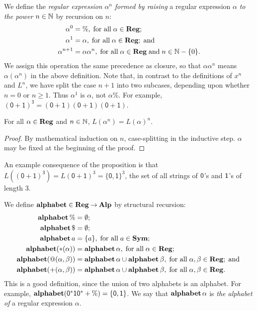 We define the \emph{regular expression} $\alpha^n$ \emph{formed by
raising} a regular expression $\alpha$ \emph{to the power} $n\in\mathbb{N}$ by
recursion on $n$:
%
%
\begin{align*}
\alpha^0       &= \%, \;\allowbreak\mbox{for all}\allowbreak\;\alpha\in\mathbf{Reg}; \\
\alpha^1       &= \alpha, \;\allowbreak\mbox{for all}\allowbreak\;\alpha\in\mathbf{Reg}; \;\allowbreak\mbox{and}\allowbreak\; \\
\alpha^{n + 1} &= \alpha\alpha^n,\;\allowbreak\mbox{for all}\allowbreak\;\alpha\in\mathbf{Reg}\;\allowbreak\mbox{and}\allowbreak\;
n\in\mathbb{N}-\{0\} .
\end{align*}
We assign this operation the same precedence as closure, so that
$\alpha\alpha^n$ means $\alpha(\alpha^n)$ in the above definition.
Note that, in contrast to the definitions of $x^n$ and $L^n$,
we have split the case $n+1$ into two subcases, depending upon
whether $n=0$ or $n\geq 1$. Thus
$\alpha^1$ is $\alpha$, not $\alpha\%$.
For example, $\mathsf{(0+1)^3}=\mathsf{(0+1)(0+1)(0+1)}$.

\begin{proposition}
\label{RegExponProp}
For all $\alpha\in\mathbf{Reg}$ and $n\in\mathbb{N}$, $L(\alpha^n)=L(\alpha)^n$.
\end{proposition}

\begin{proof}
By mathematical induction on $n$, case-splitting in the inductive
step. $\alpha$ may be fixed at the beginning of the proof.
\end{proof}

An example consequence of the proposition is that
$L(\mathsf{(0+1)^3})=L(\mathsf{0+1})^3=\{\mathsf{0,1}\}^3$, the
set of all strings of $\mathsf{0}$'s and $\mathsf{1}$'s of length $3$.

We define $\mathbf{alphabet}\in\mathbf{Reg}\mathbin{\to}\mathbf{Alp}$ by structural recursion:
%
%
\begin{align*}
\mathbf{alphabet}\,\% &= \emptyset; \\
\mathbf{alphabet}\,\$ &= \emptyset; \\
\mathbf{alphabet}\,a &= \{a\}, \;\allowbreak\mbox{for all}\allowbreak\;a\in\mathbf{Sym}; \\
\mathbf{alphabet}({*}(\alpha)) &= \mathbf{alphabet}\,\alpha, \;\allowbreak\mbox{for all}\allowbreak\;\alpha\in\mathbf{Reg};\\
\mathbf{alphabet}(@(\alpha,\beta)) &= \mathbf{alphabet}\,\alpha\cup\mathbf{alphabet}\,\beta ,
\;\allowbreak\mbox{for all}\allowbreak\;\alpha,\beta\in\mathbf{Reg}; \;\allowbreak\mbox{and}\allowbreak\; \\
\mathbf{alphabet}({+}(\alpha,\beta)) &= \mathbf{alphabet}\,\alpha\cup\mathbf{alphabet}\,\beta,
\;\allowbreak\mbox{for all}\allowbreak\;\alpha,\beta\in\mathbf{Reg} .
\end{align*}
This is a good definition, since the union of two alphabets is
an alphabet. For example,
$\mathbf{alphabet}(\mathsf{0^*10^*+\%}) = \mathsf{\{0,1\}}$.
We say that $\mathbf{alphabet}\,\alpha$ is \emph{the alphabet of} a regular
expression $\alpha$.

